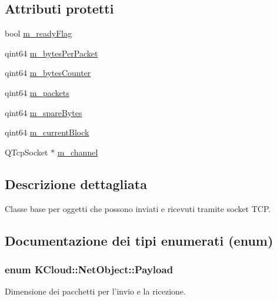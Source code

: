 \subsection*{Attributi protetti}
\begin{DoxyCompactItemize}
\item 
bool \hyperlink{class_k_cloud_1_1_net_object_ad288fce4a739cd7af358d0b0d35acc32}{m\-\_\-ready\-Flag}
\item 
qint64 \hyperlink{class_k_cloud_1_1_net_object_a3b8a0e077659f9a2081b4fd7128cf744}{m\-\_\-bytes\-Per\-Packet}
\item 
qint64 \hyperlink{class_k_cloud_1_1_net_object_a98879b8a704faa1d218ddb9d2cc57f89}{m\-\_\-bytes\-Counter}
\item 
qint64 \hyperlink{class_k_cloud_1_1_net_object_a576585f2e698bc41dc0493e7f85b8a62}{m\-\_\-packets}
\item 
qint64 \hyperlink{class_k_cloud_1_1_net_object_aa3b36c0a1218c00a456aecdee9865d60}{m\-\_\-spare\-Bytes}
\item 
qint64 \hyperlink{class_k_cloud_1_1_net_object_a3de377affcaa5f8f236c4ec6caee5e44}{m\-\_\-current\-Block}
\item 
Q\-Tcp\-Socket $\ast$ \hyperlink{class_k_cloud_1_1_net_object_a124b1e5128388353ec7995365ab19424}{m\-\_\-channel}
\end{DoxyCompactItemize}


\subsection{Descrizione dettagliata}
Classe base per oggetti che possono inviati e ricevuti tramite socket T\-C\-P. 

\subsection{Documentazione dei tipi enumerati (enum)}
\hypertarget{class_k_cloud_1_1_net_object_a1183d14b184b27ea397cbf2857bc791b}{
\subsubsection[{Payload}]{\setlength{\rightskip}{0pt plus 5cm}enum {\bf K\-Cloud\-::\-Net\-Object\-::\-Payload}}}\label{class_k_cloud_1_1_net_object_a1183d14b184b27ea397cbf2857bc791b}


Dimensione dei pacchetti per l'invio e la ricezione. 

